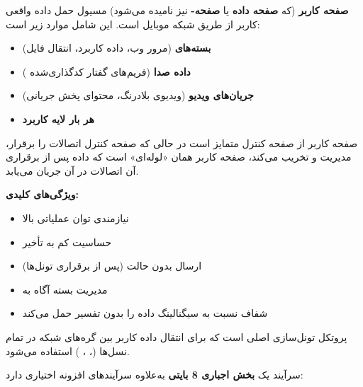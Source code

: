
\textbf{صفحه کاربر} (که \textbf{صفحه داده} یا \textbf{صفحه-} نیز نامیده می‌شود) مسیول حمل داده واقعی کاربر از طریق شبکه موبایل است. این شامل موارد زیر است:

\begin{itemize}
\tightlist
\item
  \textbf{بسته‌های } (مرور وب، داده کاربرد، انتقال فایل)
\item
  \textbf{داده صدا} (فریم‌های گفتار کدگذاری‌شده )
\item
  \textbf{جریان‌های ویدیو} (ویدیوی بلادرنگ، محتوای پخش جریانی)
\item
  \textbf{هر بار لایه کاربرد}
\end{itemize}

صفحه کاربر از صفحه کنترل متمایز است  در حالی که صفحه کنترل اتصالات را برقرار، مدیریت و تخریب می‌کند، صفحه کاربر همان «لوله‌ای» است که داده پس از برقراری آن اتصالات در آن جریان می‌یابد.

\textbf{ویژگی‌های کلیدی:}

\begin{itemize}
\tightlist
\item
  نیازمندی توان عملیاتی بالا
\item
  حساسیت کم به تأخیر
\item
  ارسال بدون حالت (پس از برقراری تونل‌ها)
\item
  مدیریت بسته آگاه به 
\item
  شفاف نسبت به سیگنالینگ  داده را بدون تفسیر حمل می‌کند
\end{itemize}



 پروتکل تونل‌سازی اصلی است که برای انتقال داده کاربر بین گره‌های شبکه در تمام نسل‌ها (، ، ) استفاده می‌شود.


سرآیند  یک \textbf{بخش اجباری 8 بایتی} به‌علاوه سرآیندهای افزونه اختیاری دارد:


